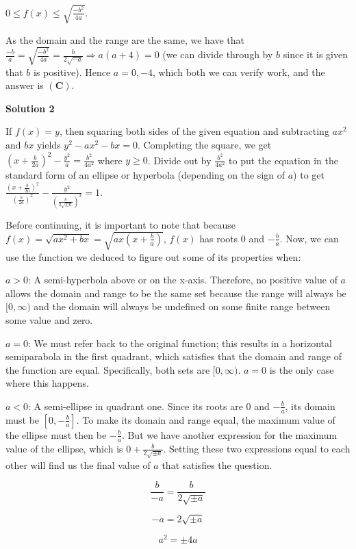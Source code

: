 \begin{enumerate}
 $0 \le f(x) \le \sqrt{\frac{-b^2}{4a}}.$

 As the domain and the range are the same, we have that $\frac{-b}{a} = \sqrt{\frac{-b^2}{4a}} = \frac{b}{2\sqrt{-a}} \Longrightarrow a(a+4) = 0$ (we can divide through by $b$ since it is given that $b$ is positive). Hence $a = 0, -4$, which both we can verify work, and the answer is $\mathbf{(C)}$.

 



\textbf{Solution 2}

If $f(x)=y$, then squaring both sides of the given equation and subtracting $ax^2$ and $bx$ yields $y^2-ax^2-bx=0$. Completing the square, we get $(x+\frac{b}{2a})^2-\frac{y^2}{a}=\frac{b^2}{4a^2}$ where $y\geq 0$. Divide out by $\frac{b^2}{4a^2}$ to put the equation in the standard form of an ellipse or hyperbola (depending on the sign of $a$) to get $\frac{(x+\frac{b}{2a})^2}{(\frac{b}{2a})^2}-\frac{y^2}{(\frac{b}{2\sqrt {\pm a}})^2}=1$.

 Before continuing, it is important to note that because $f(x)=\sqrt{ax^2+bx}=\sqrt{ax(x+\frac{b}{a})}$, $f(x)$ has roots 0 and $-\frac{b}{a}$. Now, we can use the function we deduced to figure out some of its properties when:

 $a>0$: A semi-hyperbola above or on the x-axis. Therefore, no positive value of $a$ allows the domain and range to be the same set because the range will always be $[0, \infty)$ and the domain will always be undefined on some finite range between some value and zero.

 $a=0$: We must refer back to the original function; this results in a horizontal semiparabola in the first quadrant, which satisfies that the domain and range of the function are equal. Specifically, both sets are $[0, \infty )$. $a=0$ is the only case where this happens.

 $a<0$: A semi-ellipse in quadrant one. Since its roots are 0 and $-\frac{b}{a}$, its domain must be $[0, -\frac{b}{a}]$. To make its domain and range equal, the maximum value of the ellipse must then be $-\frac{b}{a}$. But we have another expression for the maximum value of the ellipse, which is $0+\frac{b}{2\sqrt {\pm a}}$. Setting these two expressions equal to each other will find us the final value of $a$ that satisfies the question.

 
 \[\frac{b}{-a}=\frac{b}{2\sqrt {\pm a}}\]

 \[-a=2\sqrt {\pm a}\]

 \[a^2=\pm 4a\]


\end{enumerate}
